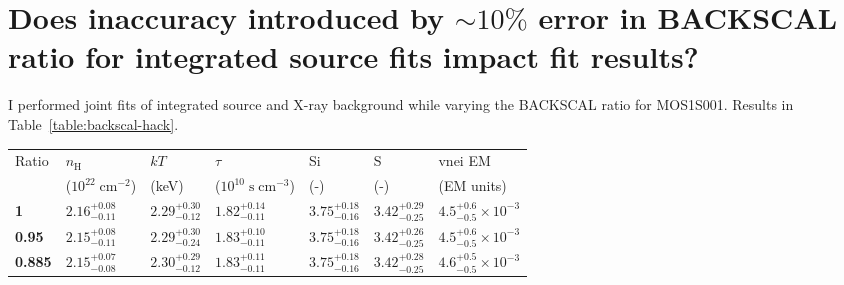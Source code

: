 \documentclass[preprint2,tighten,trackchanges]{aastex6}
\newcommand*{\mt}{\mathrm}
\newcommand*{\unit}[1]{\;\mt{#1}}  %
\newcommand*{\abt}{\mathord{\sim}} %
\begin{document}
\section{Does inaccuracy introduced by $\abt 10\%$ error in BACKSCAL ratio for
integrated source fits impact fit results?}

I performed joint fits of integrated source and X-ray background while
varying the BACKSCAL ratio for MOS1S001.
Results in Table~\ref{table:backscal-hack}.

\begin{table*}[!h]
    \centering
    \caption{2009 (Motch) MOS1 BACKSCAL ratio has very little effect on fits
        \label{table:backscal-hack}}

    \begin{tabular}{@{}lllllll@{}}
    \toprule
    Ratio & $n_\mathrm{H}$ & $kT$ & $\tau$ & Si & S & vnei EM \\
     & ($10^{22} \unit{cm^{-2}}$) & (keV) & ($10^{10} \unit{s\;cm^{-3}}$) & (-) & (-) & (EM units) \\
    \midrule
    \textbf{1}     & ${2.16}^{+0.08}_{-0.11}$ & ${2.29}^{+0.30}_{-0.12}$ & ${1.82}^{+0.14}_{-0.11}$
          & ${3.75}^{+0.18}_{-0.16}$ & ${3.42}^{+0.29}_{-0.25}$ & ${4.5}^{+0.6}_{-0.5} \times 10^{-3}$ \\
    \textbf{0.95}  & $2.15^{+0.08}_{-0.11}$ & $2.29^{+0.30}_{-0.24}$ & $1.83^{+0.10}_{-0.11}$  %
          & $3.75^{+0.18}_{-0.16}$ & $3.42^{+0.26}_{-0.25}$ & $4.5^{+0.6}_{-0.5} \times 10^{-3}$ \\ %
    \textbf{0.885} & ${2.15}^{+0.07}_{-0.08}$ & ${2.30}^{+0.29}_{-0.12}$ & ${1.83}^{+0.11}_{-0.11}$
          & ${3.75}^{+0.18}_{-0.16}$ & ${3.42}^{+0.28}_{-0.25}$ & ${4.6}^{+0.5}_{-0.5} \times 10^{-3}$ \\
    \bottomrule
    \end{tabular}

    \quad
    \quad


\end{table*}
\end{document}
